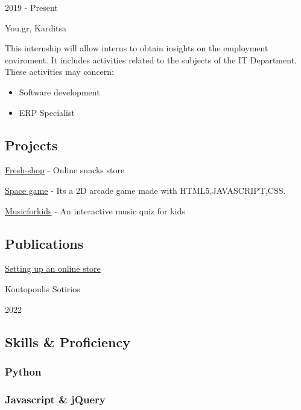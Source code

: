 \documentclass[
]{article}
\providecommand{\tightlist}{%
  \setlength{\itemsep}{0pt}\setlength{\parskip}{0pt}}
\begin{document}
2019 - Present

You.gr, Karditsa

This internship will allow interns to obtain insights on the employment
enviroment. It includes activities related to the subjects of the IT
Department. These activities may concern:

\begin{itemize}
\tightlist
\item
  Software development
\item
  ERP Specialist
\end{itemize}

\hypertarget{projects}{%
\subsection{\texorpdfstring{{ \emph{} \emph{} }
Projects}{    Projects}}\label{projects}}

{
\protect\hyperlink{https:ux2fux2ffresh-shop-karditsa.lovestoblog.com}{Fresh-shop}
} - {Online snacks store}

{ \protect\hyperlink{https:ux2fux2fyoutu.beux2fbVnPYdtEyqM}{Space game}
} - {Its a 2D arcade game made with HTML5,JAVASCRIPT,CSS.}

{ \protect\hyperlink{https:ux2fux2fyoutu.beux2fUf3GYYz6ZK}{Musicforkids}
} - {An interactive music quiz for kids}

\hypertarget{publications}{%
\subsection{\texorpdfstring{{ \emph{} \emph{} }
Publications}{    Publications}}\label{publications}}

\protect\hyperlink{}{Setting up an online store}

Koutopoulis Sotirios

2022

\hypertarget{skills-proficiency}{%
\subsection{\texorpdfstring{{ \emph{} \emph{} } Skills \&
Proficiency}{    Skills \& Proficiency}}\label{skills-proficiency}}

\hypertarget{python}{%
\subsubsection{Python}\label{python}}

\hypertarget{javascript-jquery}{%
\subsubsection{Javascript \& jQuery}\label{javascript-jquery}}
\end{document}
